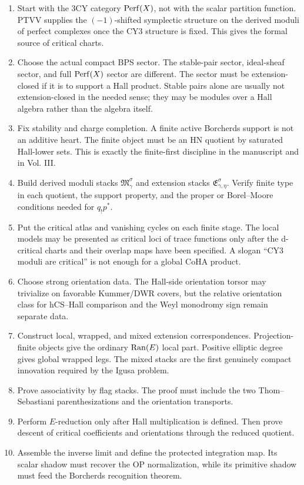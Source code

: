 \begin{enumerate}
\item Start with the 3CY category \(\operatorname{Perf}(X)\), not with the scalar
partition function.  PTVV supplies the \((-1)\)-shifted symplectic
structure on the derived moduli of perfect complexes once the CY3
structure is fixed.  This gives the formal source of critical charts.

\item Choose the actual compact BPS sector.  The stable-pair sector,
ideal-sheaf sector, and full \(\operatorname{Perf}(X)\) sector are different.  The
sector must be extension-closed if it is to support a Hall product.
Stable pairs alone are usually not extension-closed in the needed
sense; they may be modules over a Hall algebra rather than the algebra
itself.

\item Fix stability and charge completion.  A finite active Borcherds
support is not an additive heart.  The finite object must be an HN
quotient by saturated Hall-lower sets.  This is exactly the
finite-first discipline in the manuscript and in Vol. III.

\item Build derived moduli stacks \(\mathfrak M_\gamma^\sigma\) and
extension stacks \(\mathfrak E_{\gamma,\eta}^\sigma\).  Verify finite
type in each quotient, the support property, and the proper or
Borel--Moore conditions needed for \(q_!p^*\).

\item Put the critical atlas and vanishing cycles on each finite stage.
The local models may be presented as critical loci of trace functions
only after the d-critical charts and their overlap maps have been
specified.  A slogan ``CY3 moduli are critical'' is not enough for a
global CoHA product.

\item Choose strong orientation data.  The Hall-side orientation torsor
may trivialize on favorable Kummer/DWR covers, but the relative
orientation class for hCS--Hall comparison and the Weyl monodromy sign
remain separate data.

\item Construct local, wrapped, and mixed extension correspondences.
Projection-finite objects give the ordinary \(\operatorname{Ran}(E)\) local part.
Positive elliptic degree gives global wrapped legs.  The mixed stacks
are the first genuinely compact innovation required by the Igusa
problem.

\item Prove associativity by flag stacks.  The proof must include the
two Thom--Sebastiani parenthesizations and the orientation transports.

\item Perform \(E\)-reduction only after Hall multiplication is defined.
Then prove descent of critical coefficients and orientations through the
reduced quotient.

\item Assemble the inverse limit and define the protected integration
map.  Its scalar shadow must recover the OP normalization, while its
primitive shadow must feed the Borcherds recognition theorem.
\end{enumerate}

